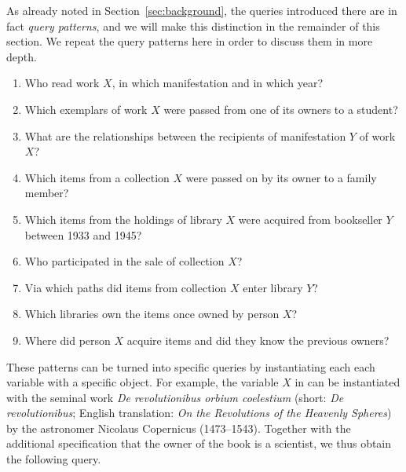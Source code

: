 As already noted in Section~\ref{sec:background}, the queries introduced there
are in fact \emph{query patterns}, and we will make this distinction in the remainder
of this section. We repeat the query patterns here in order to discuss them in more depth.
%
\begin{enumerate}
  \item[\exaquery{1}]
    Who read %
    work $X$, in which manifestation and in which year?
  \item[\exaquery{2}]
    Which exemplars
    of work $X$
    were passed from one of its owners to a student?
  \item[\exaquery{3}]
    What are the relationships between the recipients of manifestation $Y$ of work $X$?
  \item[\exaquery{4}]
    Which items from a collection $X$ were passed on by its owner to a family member?
  \item[\exaquery{5}]
    Which items from the holdings of library $X$ were acquired from bookseller $Y$
    between 1933 and 1945?
  \item[\exaquery{6}]
    Who participated in the sale of collection $X$?
  \item[\exaquery{7}]
    Via which paths did items from collection $X$ enter library $Y$?
  \item[\exaquery{8}]
    Which libraries own the items once owned by person $X$?
  \item[\exaquery{9}]
    Where did person $X$ acquire items and did they know the previous owners?
\end{enumerate}
%
These patterns can be turned into specific queries by instantiating each each variable with a specific object.
For example, the variable $X$
in  can be instantiated with the seminal work \emph{De revolutionibus orbium coelestium}
(short: \emph{De revolutionibus}; English translation: \emph{On the Revolutions of the Heavenly Spheres}) \autocite{Kopernikus1543}
by the astronomer Nicolaus Copernicus (1473–1543).
Together with the additional specification that the owner of the book is a scientist,
we thus obtain the following query.
